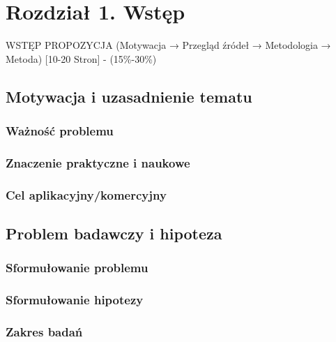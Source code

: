 \section{Rozdział 1. Wstęp}
WSTĘP PROPOZYCJA (Motywacja → Przegląd źródeł → Metodologia → Metoda) [10-20 Stron] - (15\%-30\%) %
\subsection{Motywacja i uzasadnienie tematu}
\subsubsection*{Ważność problemu}
\subsubsection*{Znaczenie praktyczne i naukowe}
\subsubsection*{Cel aplikacyjny/komercyjny}

\subsection{Problem badawczy i hipoteza}


\subsubsection*{Sformułowanie problemu}
\subsubsection*{Sformułowanie hipotezy}
\subsubsection*{Zakres badań}

